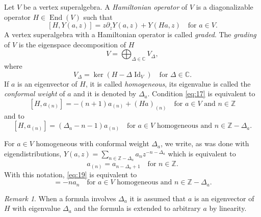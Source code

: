 \documentclass[a4paper, 12pt, reqno]{amsart}
\theoremstyle{remark}
\newtheorem{remark}[theorem]{Remark}
\numberwithin{equation}{subsection}
\DeclareMathOperator{\Id}{Id}
\DeclareMathOperator{\End}{End}
\begin{document}
Let $V$ be a vertex superalgebra.
A \emph{Hamiltonian operator} of $V$ is a diagonalizable operator $H \in \End(V)$ such that
\begin{equation}
  \label{eq:17}
  [H, Y(a, z)] = z\partial_zY(a, z) + Y(Ha, z) \quad \text{for }a \in V.
\end{equation}
A vertex superalgebra with a Hamiltonian operator is called \emph{graded}.
The \emph{grading} of $V$ is the eigenspace decomposition of $H$
\begin{equation*}
  V = \bigoplus_{\Delta \in \mathbb{C}}V_{\Delta},
\end{equation*}
where
\begin{equation*}
  V_{\Delta} = \ker(H - \Delta\Id_V) \quad \text{for }\Delta \in \mathbb{C}.
\end{equation*}
If $a$ is an eigenvector of $H$, it is called \emph{homogeneous}, its eigenvalue is called the \emph{conformal weight} of $a$ and it is denoted by $\Delta_a$.
Condition \eqref{eq:17} is equivalent to
\begin{equation}
  \label{eq:18}
  [H, a_{(n)}] = -(n + 1)a_{(n)} + (Ha)_{(n)} \quad \text{for }a \in V\text{ and }n \in \mathbb{Z}
\end{equation}
and to
\begin{equation}
  \label{eq:19}
  [H, a_{(n)}] = (\Delta_a - n - 1)a_{(n)} \quad \text{for }a \in V\text{ homogeneous and }n \in \mathbb{Z} - \Delta_a.
\end{equation}

For $a \in V$ homogeneous with conformal weight $\Delta_a$, we write, as was done with eigendistributions, $Y(a, z) = \sum_{n \in \mathbb{Z} - \Delta_a}a_nz^{-n - \Delta_a}$ which is equivalent to
\begin{equation*}
  a_{(n)} = a_{n - \Delta_a + 1} \quad \text{for }n \in \mathbb{Z}.
\end{equation*}
With this notation, \eqref{eq:19} is equivalent to
\begin{equation*}
  [H, a_n] = -na_n \quad \text{for }a \in V\text{ homogeneous and }n \in \mathbb{Z} - \Delta_a.
\end{equation*}

\begin{remark}
  \label{rmk:18}
  When a formula involves $\Delta_a$ it is assumed that $a$ is an eigenvector of $H$ with eigenvalue $\Delta_a$ and the formula is extended to arbitrary $a$ by linearity.
\end{remark}
\end{document}
